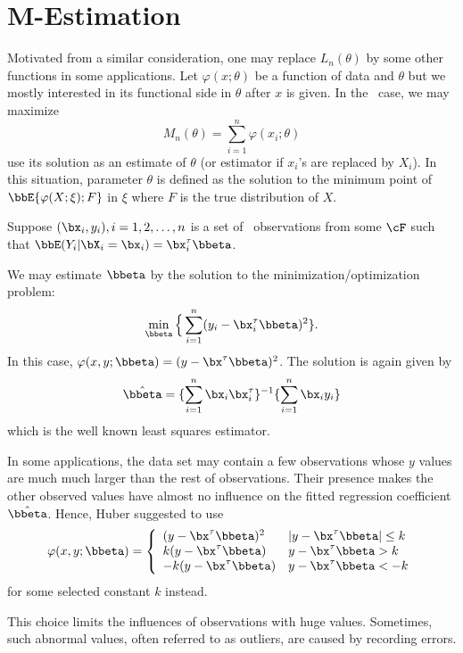 \section{M-Estimation}
Motivated from a similar consideration, one may
replace $L_n(\theta)$ by some other functions in some applications.
Let $\varphi(x; \theta)$ be a function of data and $\theta$ but we
mostly interested in its functional side in $\theta$ after $x$ is given.
In the \iid\ case, we may maximize
\[
M_n(\theta) = \sum_{i=1}^n \varphi(x_i; \theta)
\]
use its solution as an estimate of $\theta$ (or estimator if $x_i$'s are replaced by $X_i$).
In this situation, parameter $\theta$ is defined as
the solution to the minimum point of $\bbE\{ \varphi(X; \xi); F\}$
in $\xi$ where $F$ is the true distribution of $X$.

\begin{example}
Suppose $(\bx_i, y_i), i=1, 2, \ldots, n$ is a set of \iid\ observations from some
$\cF$ such that $\bbE(Y_i| \bX_i = \bx_i) = \bx_i^\tau \bbeta$.

We may estimate $\bbeta$ by the solution to 
the minimization/optimization problem:
\[
\min_{\bbeta}  \Big \{ \sum_{i=1}^n (y_i - \bx_i^\tau \bbeta)^2 \}.
\]
In this case, $\varphi(x, y; \bbeta) = (y - \bx^\tau \bbeta)^2$.
The solution is again given by
\[
\hat \bbeta = \{ \sum_{i=1}^n \bx_i \bx_i^\tau\}^{-1} \{ \sum_{i=1}^n \bx_i y_i\}
\]
which is the well known least squares estimator.

In some applications, the data set may contain a few observations
whose $y$ values are much much larger than the rest of observations.
Their presence makes the other observed values have almost no
influence on the fitted regression coefficient $\hat \bbeta$. Hence,
Huber suggested to use 
\[
\varphi(x, y; \bbeta) 
=
\left \{
\begin{array}{ll}
 (y - \bx^\tau \bbeta)^2 & |y - \bx^\tau \bbeta| \leq k\\
k(y - \bx^\tau \bbeta) &  y - \bx^\tau \bbeta > k\\
- k(y - \bx^\tau \bbeta) &  y - \bx^\tau \bbeta < - k
\end{array}
\right .
\]
for some selected constant $k$ instead.

This choice limits the influences of observations with
huge values. Sometimes, such abnormal values, often referred
to as outliers, are caused by recording errors.
\end{example}


